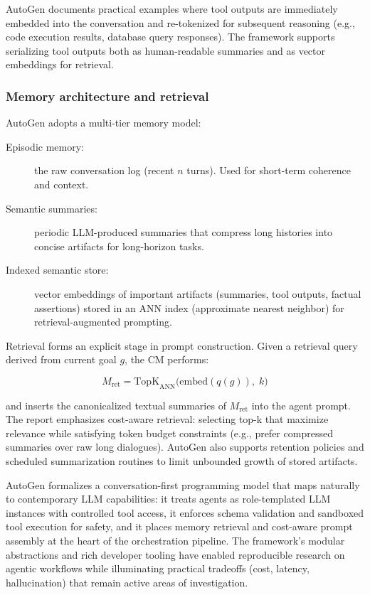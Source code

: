 AutoGen documents practical examples where tool outputs are immediately embedded into the conversation and re-tokenized for subsequent reasoning (e.g., code execution results, database query responses). The framework supports serializing tool outputs both as human-readable summaries and as vector embeddings for retrieval.

\subsubsection{Memory architecture and retrieval}
\label{sec:autogen_memory}

AutoGen adopts a multi-tier memory model:

\begin{description}
  \item[Episodic memory:] the raw conversation log (recent $n$ turns). Used for short-term coherence and context.
  \item[Semantic summaries:] periodic LLM-produced summaries that compress long histories into concise artifacts for long-horizon tasks.
  \item[Indexed semantic store:] vector embeddings of important artifacts (summaries, tool outputs, factual assertions) stored in an ANN index (approximate nearest neighbor) for retrieval-augmented prompting.
\end{description}

Retrieval forms an explicit stage in prompt construction. Given a retrieval query derived from current goal \(g\), the CM performs:

\[
M_{\mathrm{ret}} = \text{TopK}_{\mathrm{ANN}}\big(\mathrm{embed}(q(g)),\; k\big)
\]

and inserts the canonicalized textual summaries of \(M_{\mathrm{ret}}\) into the agent prompt. The report emphasizes cost-aware retrieval: selecting top-k that maximize relevance while satisfying token budget constraints (e.g., prefer compressed summaries over raw long dialogues). AutoGen also supports retention policies and scheduled summarization routines to limit unbounded growth of stored artifacts. \cite{autogen_arXiv, autogen_github}

 AutoGen formalizes a conversation-first programming model that maps naturally to contemporary LLM capabilities: it treats agents as role-templated LLM instances with controlled tool access, it enforces schema validation and sandboxed tool execution for safety, and it places memory retrieval and cost-aware prompt assembly at the heart of the orchestration pipeline. The framework's modular abstractions and rich developer tooling have enabled reproducible research on agentic workflows while illuminating practical tradeoffs (cost, latency, hallucination) that remain active areas of investigation.

